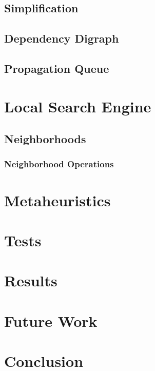 \documentclass[a4paper,11pt]{article}
\begin{document}
  \subsection{Simplification}
  
  \subsection{Dependency Digraph}
     \label{sec_ddg}
  \subsection{Propagation Queue}  
    \label{sec_propaqueue}
    
  
  
\section{Local Search Engine} \label{sec_local}
  \subsection{Neighborhoods}
    \subsubsection{Neighborhood Operations}
\section{Metaheuristics}
\section{Tests}
\section{Results}
\section{Future Work}
  
\section{Conclusion}
\end{document}

